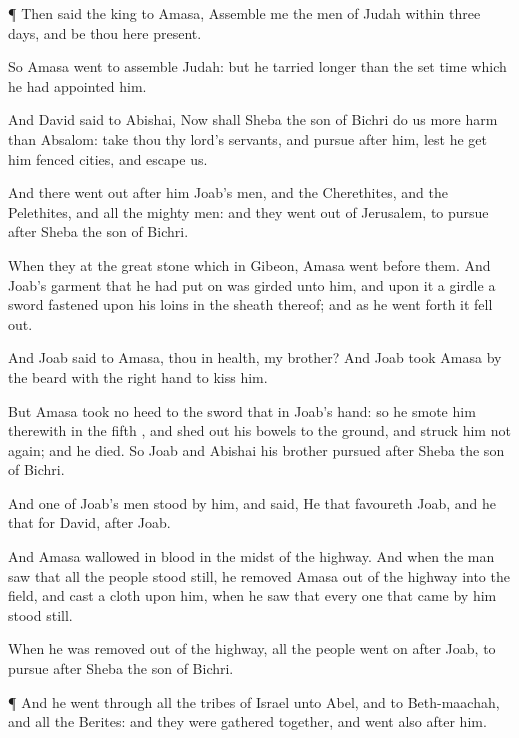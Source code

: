 {\par }{\PP {}¶ Then
said the
king to
Amasa,
Assemble me the
men of
Judah within
three
days, and be thou here
present.

So
Amasa
went to
assemble
{}
Judah: but he tarried
longer than the set
time which he had
appointed him.

And
David
said to
Abishai, Now shall
Sheba the
son of
Bichri do us more
harm than
{}
Absalom:
take thou thy
lord’s
servants, and
pursue
after him, lest he
get him
fenced
cities, and
escape
us.

And there went
out
after him
Joab’s
men, and the
Cherethites, and the
Pelethites, and all the mighty
men: and they went
out of
Jerusalem, to
pursue
after
Sheba the
son of
Bichri.

When they
{} at the
great
stone which
{} in
Gibeon,
Amasa
went
before them. And
Joab’s
garment that he had put
on was
girded unto him, and upon it a
girdle
{} a
sword
fastened upon his
loins in the
sheath thereof; and as he went
forth it fell
out.

And
Joab
said to
Amasa,
{} thou in
health, my
brother? And
Joab
took
Amasa by the
beard with the
right
hand to
kiss him.

But
Amasa took no
heed to the
sword that
{} in
Joab’s
hand: so he
smote him therewith in the
fifth
{}, and shed
out his
bowels to the
ground, and struck him not
again; and he
died. So
Joab and
Abishai his
brother
pursued
after
Sheba the
son of
Bichri.

And
one of
Joab’s
men
stood by him, and
said,
He that
favoureth
Joab, and he that
{} for
David,
{}
after
Joab.

And
Amasa
wallowed in
blood in the
midst of the
highway. And when the
man
saw that all the
people stood
still, he
removed
Amasa out of the
highway into the
field, and
cast a
cloth upon him, when he
saw that every one that
came by him stood
still.

When he was
removed out of the
highway, all the
people went
on
after
Joab, to
pursue
after
Sheba the
son of
Bichri.


\par }{\PP {}¶ And he
went through all the
tribes of
Israel unto
Abel, and to
Beth-maachah, and all the
Berites: and they were gathered
together, and
went also
after him.

}
